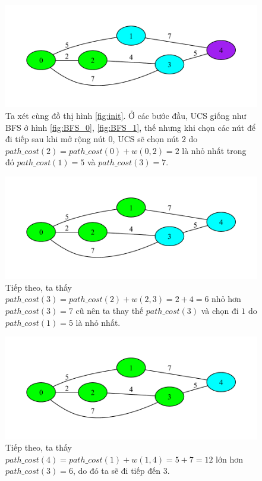 \begin{figure}[H]
    \centering
    \includegraphics[scale=0.7]{figure/UCS/2.pdf}
    \caption{Ta xét cùng đồ thị hình \ref{fig:init}. Ở các bước đầu, UCS giống như BFS ở hình \ref{fig:BFS_0}, \ref{fig:BFS_1}, thế nhưng khi chọn các nút để đi tiếp sau khi mở rộng nút $0$, UCS sẽ chọn nút $2$ do $path\_cost(2) = path\_cost(0) + w(0, 2) = 2$ là nhỏ nhất trong đó $path\_cost(1) = 5$ và $path\_cost(3) = 7$.}
    \label{fig:UCS_2}
\end{figure}

\begin{figure}[H]
    \centering
    \includegraphics[scale=0.7]{figure/UCS/3.pdf}
    \caption{Tiếp theo, ta thấy $path\_cost(3) = path\_cost(2) + w(2, 3) = 2 + 4 = 6$ nhỏ hơn $path\_cost(3) = 7$ cũ nên ta thay thế $path\_cost(3)$ và chọn đi $1$ do $path\_cost(1) = 5$ là nhỏ nhất.}
    \label{fig:UCS_3}
\end{figure}

\begin{figure}[H]
    \centering
    \includegraphics[scale=0.7]{figure/UCS/4.pdf}
    \caption{Tiếp theo, ta thấy $path\_cost(4) = path\_cost(1) + w(1, 4) = 5 + 7 = 12$ lớn hơn $path\_cost(3) = 6$, do đó ta sẽ đi tiếp đến $3$.}
    \label{fig:UCS_4}
\end{figure}

